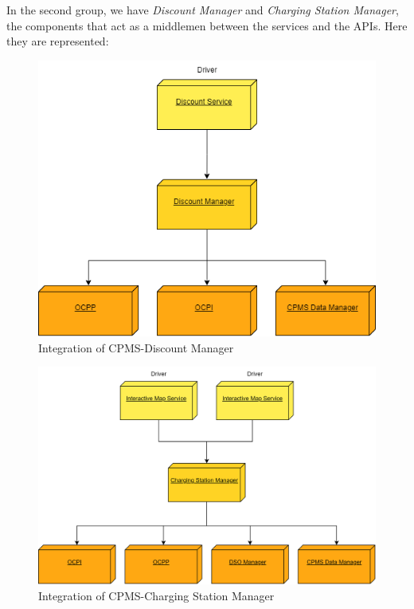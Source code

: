 \documentclass[table, 12pt]{article}
\begin{document}
In the second group, we have \emph{Discount Manager} and \emph{Charging Station Manager}, the components that act as a middlemen between the services and the APIs.
Here they are represented:

\begin{figure}[H]
    \centering
    \includegraphics[scale=0.6]{assets/Integration Diagrams/CPMS-Discount Manager.png} 
    \caption{Integration of CPMS-Discount Manager}%
    \label{fig: CPMS-Discount Manager}%
\end{figure}

\begin{figure}[H]
    \centering
    \includegraphics[scale=0.6]{assets/Integration Diagrams/CPMS-Charging Station Manager.png} 
    \caption{Integration of CPMS-Charging Station Manager}%
    \label{fig: CPMS-Charging Station Manager}%
\end{figure}
\end{document}
